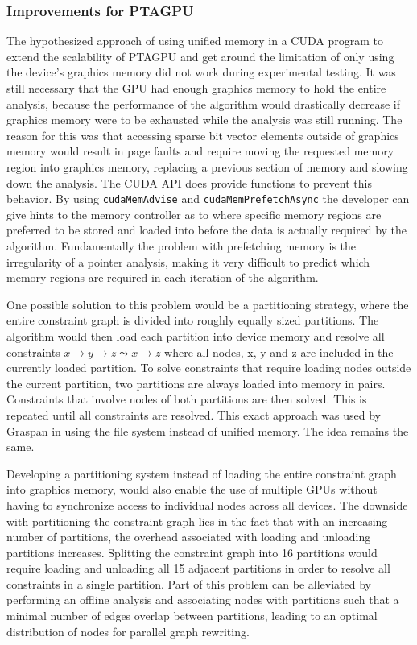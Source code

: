 \subsubsection{Improvements for PTAGPU}
The hypothesized approach of using unified memory in a CUDA program to extend the scalability of PTAGPU and get around the limitation of only using the device's graphics memory did not work during experimental testing.
It was still necessary that the GPU had enough graphics memory to hold the entire analysis, because the performance of the algorithm would drastically decrease if graphics memory were to be exhausted while the analysis was still running. The reason for this was that accessing sparse bit vector elements outside of graphics memory would result in page faults and require moving the requested memory region into graphics memory, replacing a previous section of memory and slowing down the analysis.
The CUDA API does provide functions to prevent this behavior. By using \verb|cudaMemAdvise| and \verb|cudaMemPrefetchAsync| the developer can give hints to the memory controller as to where specific memory regions are preferred to be stored and loaded into before the data is actually required by the algorithm.
Fundamentally the problem with prefetching memory is the irregularity of a pointer analysis, making it very difficult to predict which memory regions are required in each iteration of the algorithm.

One possible solution to this problem would be a partitioning strategy, where the entire constraint graph is divided into roughly equally sized partitions.
The algorithm would then load each partition into device memory and resolve all constraints  $x \rightarrow y \rightarrow z \mathrel{\leadsto} x \rightarrow z$ where all nodes, x, y and z are included in the currently loaded partition.
To solve constraints that require loading nodes outside the current partition, two partitions are always loaded into memory in pairs. Constraints that involve nodes of both partitions are then solved. This is repeated until all constraints are resolved.
This exact approach was used by Graspan in \cite{zuo2021systemizing} using the file system instead of unified memory. The idea remains the same.

Developing a partitioning system instead of loading the entire constraint graph into graphics memory, would also enable the use of multiple GPUs without having to synchronize access to individual nodes across all devices.
The downside with partitioning the constraint graph lies in the fact that with an increasing number of partitions, the overhead associated with loading and unloading partitions increases.
Splitting the constraint graph into 16 partitions would require loading and unloading all 15 adjacent partitions in order to resolve all constraints in a single partition.
Part of this problem can be alleviated by performing an offline analysis and associating nodes with partitions such that a minimal number of edges overlap between partitions, leading to an optimal distribution of nodes for parallel graph rewriting.

